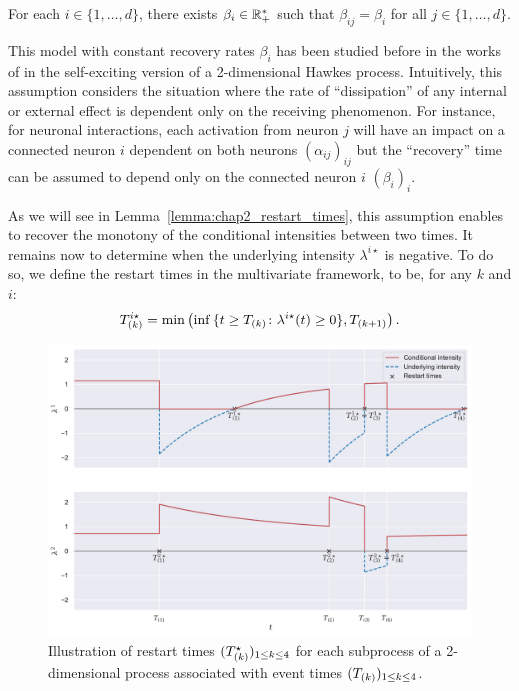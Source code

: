     \begin{assumption}\label{assu:chap2_beta}
    For each $i\in\{1,\ldots, d\}$, there exists $\beta_i\in\RR_+^*$ such that $\beta_{ij} = \beta_i$ for all $j\in\{1,\ldots, d\}$.
    \end{assumption}

    \begin{remark} This model with constant recovery rates $\beta_i$ has been studied before in the works of \textcite{Ogata1981} in the self-exciting version of a 2-dimensional Hawkes process. Intuitively, this assumption considers the situation where the rate of ``dissipation'' of any internal or external effect is dependent only on the receiving phenomenon. For instance, for neuronal interactions, each activation from neuron $j$ will have an impact on a connected neuron $i$ dependent on both neurons $(\alpha_{ij})_{ij}$ but the ``recovery'' time can be assumed to depend only on the connected neuron $i$ \((\beta_{i})_i\).
    \end{remark}

    As we will see in Lemma~\ref{lemma:chap2_restart_times}, this assumption enables to recover the monotony of the conditional intensities between two times.
    It remains now to determine when the underlying intensity \(\lambda^{i\star}\) is negative.
    To do so, we define the restart times in the multivariate framework, to be,
    for any \(k\) and \(i\):
    \[T\park^{i\star} = \min\adaptedpar{\inf{\{t\geq T\park \colon \lambda^{i\star}(t) \geq 0\}}, T\park[k+1]}.\]
    
    {\begin{figure}[!ht]
    \centering
    \includegraphics[width=0.8\linewidth]{images/chapter3/restarTimesMarkedMulti.pdf}
    \caption{Illustration of restart times $(T\park^{\star})_{1\leq k \leq 4}$ for each subprocess of a 2-dimensional process associated with event times $(T\park[k])_{1\leq k \leq 4}$.}
    \label{fig:chap2_restarttimes}
    \end{figure}}
    
